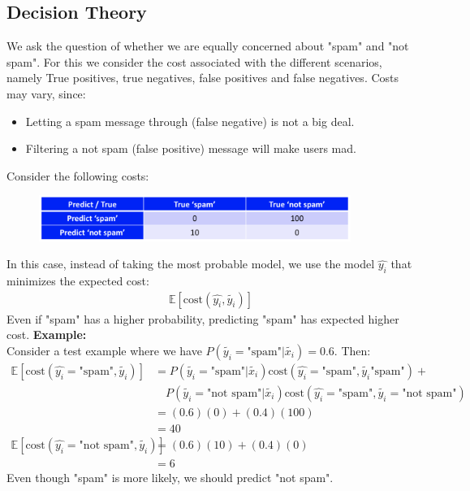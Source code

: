 \documentclass{article}
\theoremstyle{definition}
\begin{document}
\subsection*{Decision Theory}
We ask the question of whether we are equally concerned about "spam" and "not spam". For this we consider the cost associated with the different scenarios, namely True positives, true negatives, false positives and false negatives. Costs may vary, since:
\begin{itemize}
	\item Letting a spam message through (false negative) is not a big deal.
	\item Filtering a not spam (false positive) message will make users mad.
\end{itemize}
Consider the following costs:
\begin{figure}[H]
	\centering
	\includegraphics[width = 4in]{Pic1}
\end{figure}
In this case, instead of taking the most probable model, we use the model $ \hat{y_i} $ that {\color{OliveGreen} minimizes the expected cost}:
\begin{align*}
\mathbb{E}[\text{cost}(\hat{y_i}, \tilde{y_i})]
\end{align*}
Even if "spam" has a higher probability, predicting "spam" has expected higher cost.
\textbf{Example:}\\
Consider a test example where we have $ P(\tilde{y_i}=\text{"spam"} | \tilde{x_i}) = 0.6 $. Then:
\begin{align*}
	\mathbb{E}[\text{cost}(\hat{y_i} = \text{"spam"}, \tilde{y_i})] &= P(\tilde{y_i}=\text{"spam"} | \tilde{x_i})\text{cost}(\hat{y_i} = \text{"spam"}, \tilde{y_i}\text{"spam"}) + \\ & \quad P(\tilde{y_i}=\text{"not spam"} | \tilde{x_i})\text{cost}(\hat{y_i} = \text{"spam"}, \tilde{y_i} = \text{"not spam"}) \\
	&= (0.6)(0) + (0.4)(100) \\
	&= 40 \\
	\mathbb{E}[\text{cost}(\hat{y_i} = \text{"not spam"}, \tilde{y_i})] &= (0.6)(10) + (0.4)(0) \\ &= 6
\end{align*}
Even though "spam" is more likely, we should predict "not spam".
\end{document}
